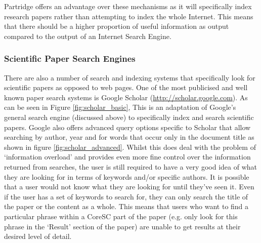 \documentclass[12pt,a4paper]{article}
\begin{document}
Partridge offers an advantage over these mechanisms as it will specifically
index research papers rather than attempting to index the whole Internet.
This means that there should be a higher proportion of useful information as
output compared to the output of an Internet Search Engine.

\subsubsection{Scientific Paper Search Engines}
There are also a number of search and indexing systems that specifically look
for scientific papers as opposed to web pages. One of the most publicised and
well known paper search systems is Google Scholar
(\url{http://scholar.google.com}).  As can be seen in Figure
\ref{fig:scholar_basic}, This is an adaptation of Google's general search
engine (discussed above) to specifically index and search scientific papers.
Google also offers advanced query options specific to Scholar that allow
searching by author, year and for words that occur only in the document title
as shown in figure \ref{fig:scholar_advanced}. Whilst this does deal with the
problem of `information overload' and provides even more fine control over the
information returned from searches,  the user is still required to have a very
good idea of what they are looking for in terms of keywords and/or specific
authors. It is possible that a user would not know what they are looking for
until they've seen it. Even if the user has a set of keywords to search for,
they can only search the title of the paper or the content as a whole. This
means that users who want to find a particular phrase within a CoreSC part of
the paper (e.g. only look for this phrase in the `Result' section of the
paper) are unable to get results at their desired level of detail.
\end{document}
